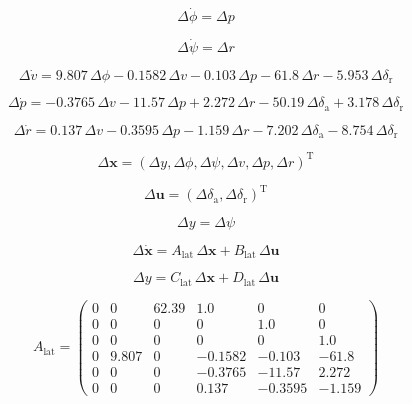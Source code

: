 \documentclass[lettersize,journal]{IEEEtran}
\begin{document}
{\begin{equation}
\Delta \dot{\phi }=\Delta p
\end{equation}

\begin{equation}
\Delta \dot{\psi }=\Delta r
\end{equation}

\begin{equation}
\Delta \dot{v}=9.807\,\Delta \phi-0.1582\,\Delta v-0.103\,\Delta p -61.8\,\Delta r-5.953\,\Delta \delta _{\mathrm{r}}
\end{equation}

\begin{equation}
\Delta \dot{p}=-0.3765\,\Delta v-11.57\,\Delta p+2.272\,\Delta r-50.19\,\Delta \delta _{\mathrm{a}}+3.178\,\Delta \delta _{\mathrm{r}}
\end{equation}

\begin{equation}
\Delta \dot{r}=0.137\,\Delta v-0.3595\,\Delta p-1.159\,\Delta r-7.202\,\Delta \delta _{\mathrm{a}}-8.754\,\Delta \delta _{\mathrm{r}}
\end{equation}

\begin{equation}
\Delta \bm{x} = (\Delta y, \Delta \phi, \Delta \psi, \Delta v, \Delta p, \Delta r)^{\mathrm{T}}
\end{equation}

\begin{equation}
\Delta \bm{u} = (\Delta \delta _{\mathrm{a}}, \Delta \delta _{\mathrm{r}})^{\mathrm{T}}
\end{equation}

\begin{equation}
\Delta y = \Delta \psi
\end{equation}

\begin{equation}
\Delta \bm{\dot{x}} = A_{\mathrm{lat}}\,\Delta\bm{x} + B_{\mathrm{lat}}\,\Delta\bm{u}
\end{equation}

\begin{equation}
\Delta y = C_{\mathrm{lat}}\,\Delta\bm{x} + D_{\mathrm{lat}}\,\Delta\bm{u}
\end{equation}

\begin{equation}
A_{\mathrm{lat}}=\left(\begin{array}{cccccc} 0 & 0 & 62.39 & 1.0 & 0 & 0\\ 0 & 0 & 0 & 0 & 1.0 & 0\\ 0 & 0 & 0 & 0 & 0 & 1.0\\ 0 & 9.807 & 0 & -0.1582 & -0.103 & -61.8\\ 0 & 0 & 0 & -0.3765 & -11.57 & 2.272\\ 0 & 0 & 0 & 0.137 & -0.3595 & -1.159 \end{array}\right)
\end{equation}

}
\end{document}
